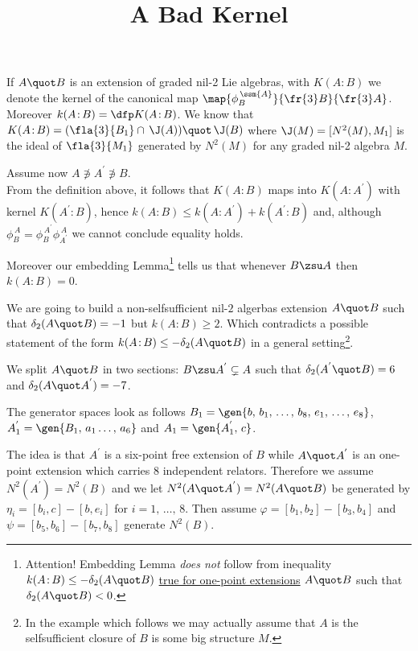 \documentclass[a4paper,11pt,german,english]{article}
\title{A Bad Kernel}
\begin{document}
\maketitle
If $A\quot B$ is an extension of graded nil-2 Lie algebras, with $K(A\colon\!B)$ we denote the kernel of the canonical map $\map{\phi^{\,\ssm{A}}_{\tiny B}}{\fr{3}B}{\fr{3}A}$.
Moreover $k(A\colon\!B)=\dfp K(A\colon\!B)$.
We know that $K(A\colon\!B)=(\fla{3}{B_{1}}\cap\,\J(A))\quot\,\J(B)$ where $\J(M)=[N^{2}(M),M_{1}]$
is the ideal of $\fla{3}{M_{1}}$ generated by $N^{2}(M)$ for any graded nil-2 algebra $M$.

Assume now $A\nni A^{'}\nni B$.\\
From the definition above, it follows that $K(A\colon\!B)$ maps into
$K(A\colon\!A^{'})$ with kernel $K(A^{'}\colon\!B)$, hence
$k(A\colon\!B)\leq k(A\colon\!A^{'})+k(A^{'}\colon\!B)$ and, although $\phi_{B}^{\,A}=\phi_{B}^{\,A^{'}}\phi_{A^{'}}^{\,A}$ we cannot conclude equality holds.

Moreover our embedding Lemma\footnote{
Attention! Embedding Lemma \emph{does not} follow from inequality $k(A\colon\!B)
\leq-\delta_{2}(A\quot B)$ \underline{true for one-point extensions} $A\quot B$ such that $\delta_{2}(A\quot B)<0$.}
tells us that whenever $B\zsu A$ then $k(A\colon\!B)=0$.


\bigskip
We are going to build a non-selfsufficient nil-$2$ algerbas extension $A\quot B$ such that
$\delta_{2}(A\quot B)=-1$ but $k(A:B)\geq2$. Which contradicts a possible statement of the form
$k(A\colon\!B)\leq-\delta_{2}(A\quot B)$ in a general setting\footnote{
In the example which follows we may actually assume that $A$ is the selfsufficient closure
of $B$ is some big structure $M$.}.

\medskip
We split $A\quot B$ in two sections: $B\zsu A^{'}\subsetneq
A$ such that $\delta_{2}(A^{'}\quot B)=6$ and $\delta_{2}(A\quot A^{'})=-7$.
 
The generator spaces look as follows $B_{1}=\gen{b,\,b_{1},\,\dots,\,b_{8},\,e_{1},\,\dots,\,e_{8}}$,
$A^{'}_{1}=\gen{B_{1},\,a_{1}\dots,\, a_{6}}$ and $A_{1}=\gen{A_{1}^{'},\,c}$.

The idea is that $A^{'}$ is a six-point free extension of $B$ while $A\quot A^{'}$ is an one-point extension which carries $8$ independent relators. Therefore we assume
$N^{2}(A^{'})=N^{2}(B)$ and we let
$N^{2}(A\quot A^{'})=N^{2}(A\quot B)$ be generated by $\eta_{i}=[b_{i},c]-[b,e_{i}]$ for $i=1,\,\dots,\,8$.
Then assume $\varphi=[b_{1},b_{2}]-[b_{3},b_{4}]$ and $\psi=[b_{5},b_{6}]-[b_{7},b_{8}]$ generate $N^{2}(B)$.
\end{document}
